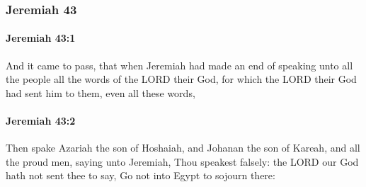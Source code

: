 	\subsubsection{Jeremiah 43} %
		\label{JEREMIAH-43}

		\paragraph{Jeremiah 43:1} %
			\label{JEREMIAH-43-1}

			And it came to pass, that when Jeremiah had made an end of speaking unto all the people all the words of the LORD their God, for which the LORD their God had sent him to them, even all these words,


		\paragraph{Jeremiah 43:2} %
			\label{JEREMIAH-43-2}

			Then spake Azariah the son of Hoshaiah, and Johanan the son of Kareah, and all the proud men, saying unto Jeremiah, Thou speakest falsely: the LORD our God hath not sent thee to say, Go not into Egypt to sojourn there:

